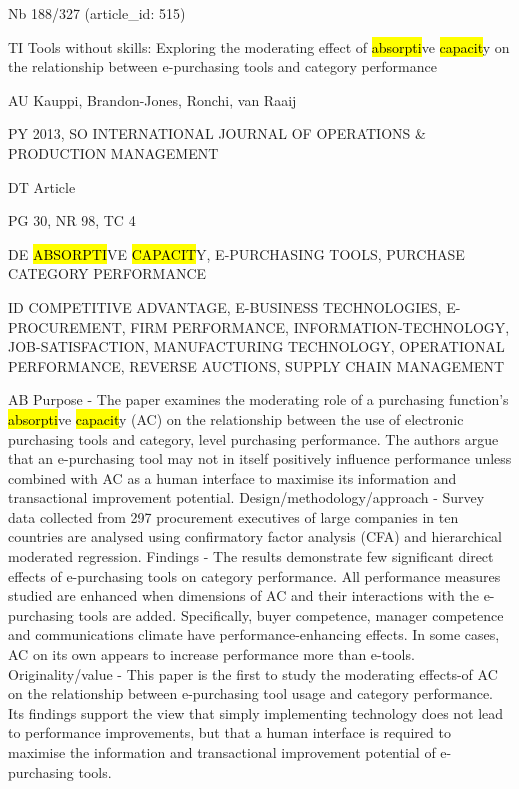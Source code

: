 \documentclass[a4paper]{article}
\begin{document}
\vspace*{-2cm}
Nb \tabto{0cm}188/327 (article\_id: 515)\par
TI \tabto{0cm}Tools without skills: Exploring the moderating effect of \hl{absorpti}ve \hl{capacit}y on the relationship between e-purchasing tools and category performance\par
AU \tabto{0cm}Kauppi, Brandon-Jones, Ronchi, van Raaij\par
PY \tabto{0cm}2013, SO INTERNATIONAL JOURNAL OF OPERATIONS \& PRODUCTION MANAGEMENT\par
DT \tabto{0cm}Article\par
PG \tabto{0cm}30, NR 98, TC 4\par
DE \tabto{0cm}\hl{ABSORPTI}VE \hl{CAPACIT}Y, E-PURCHASING TOOLS, PURCHASE CATEGORY PERFORMANCE\par
ID \tabto{0cm}COMPETITIVE ADVANTAGE, E-BUSINESS TECHNOLOGIES, E-PROCUREMENT, FIRM PERFORMANCE, INFORMATION-TECHNOLOGY, JOB-SATISFACTION, MANUFACTURING TECHNOLOGY, OPERATIONAL PERFORMANCE, REVERSE AUCTIONS, SUPPLY CHAIN MANAGEMENT\par
AB \tabto{0cm}Purpose - The paper examines the moderating role of a purchasing function's \hl{absorpti}ve \hl{capacit}y (AC) on the relationship between the use of electronic purchasing tools and category, level purchasing performance. The authors argue that an e-purchasing tool may not in itself positively influence performance unless combined with AC as a human interface to maximise its information and transactional improvement potential.
Design/methodology/approach - Survey data collected from 297 procurement executives of large companies in ten countries are analysed using confirmatory factor analysis (CFA) and hierarchical moderated regression.
Findings - The results demonstrate few significant direct effects of e-purchasing tools on category performance. All performance measures studied are enhanced when dimensions of AC and their interactions with the e-purchasing tools are added. Specifically, buyer competence, manager competence and communications climate have performance-enhancing effects. In some cases, AC on its own appears to increase performance more than e-tools.
Originality/value - This paper is the first to study the moderating effects-of AC on the relationship between e-purchasing tool usage and category performance. Its findings support the view that simply implementing technology does not lead to performance improvements, but that a human interface is required to maximise the information and transactional improvement potential of e-purchasing tools.\par
\clearpage
\end{document}
